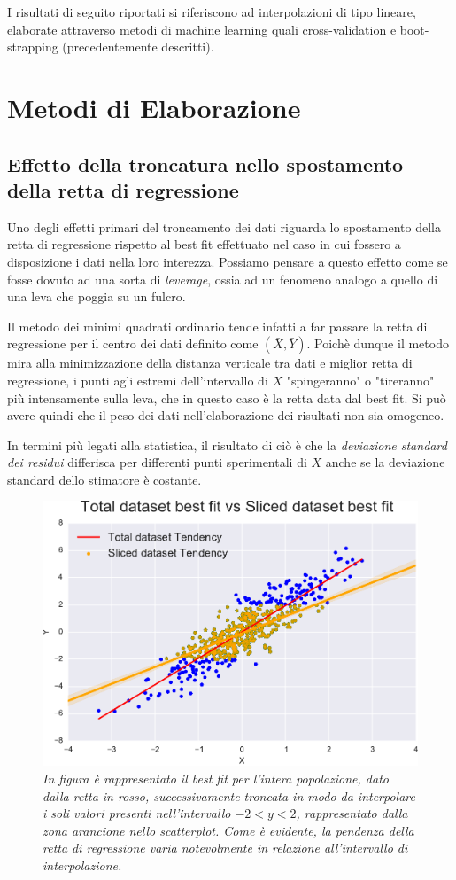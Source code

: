 \documentclass[12pt,openright,twoside,a4paper]{book}
\begin{document}
I risultati di seguito riportati si riferiscono ad interpolazioni di tipo lineare, elaborate attraverso metodi di machine learning quali cross-validation e boot-strapping (precedentemente descritti).

\section{Metodi di Elaborazione}

\subsection{Effetto della troncatura nello spostamento della retta di regressione}

Uno degli effetti primari del troncamento dei dati riguarda lo spostamento della retta di regressione rispetto al best fit effettuato nel caso in cui fossero a disposizione i dati nella loro interezza.
Possiamo pensare a questo effetto come se fosse dovuto ad una sorta di \textit{leverage}, ossia ad un fenomeno analogo a quello di una leva che poggia su un fulcro. 

Il metodo dei minimi quadrati ordinario tende infatti a far passare la retta di regressione per il centro dei dati definito come $(\bar{X},\bar{Y})$.
Poichè dunque il metodo mira alla minimizzazione della distanza verticale tra dati e miglior retta di regressione, i punti agli estremi dell'intervallo di $X$ "spingeranno" o "tireranno" più intensamente sulla leva, che in questo caso è la retta data dal best fit.
Si può avere quindi che il peso dei dati nell'elaborazione dei risultati non sia omogeneo.

In termini più legati alla statistica, il risultato di ciò è che la \textit{deviazione standard dei residui}  differisca per differenti punti sperimentali di $X$ anche se la deviazione standard dello stimatore è costante.

\begin{figure}[!h]
\centering
\includegraphics[width=0.6\linewidth]{leverage}
\caption{\textit{In figura è rappresentato il best fit per l'intera popolazione, dato dalla retta in rosso, successivamente troncata in modo da interpolare i soli valori presenti nell'intervallo $-2<y<2$, rappresentato dalla zona arancione nello scatterplot.
Come è evidente, la pendenza della retta di regressione varia notevolmente in relazione all'intervallo di interpolazione.}}
\label{leverage}
\end{figure}
\end{document}
